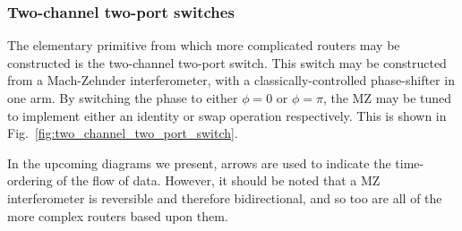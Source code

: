 \documentclass[aps, rmp, twocolumn, amsmath, amssymb, nofootinbib, superscriptaddress, longbibliography, floatfix, table-of-contents, eqsecnum]{revtex4-1}
\begin{document}
\subsubsection{Two-channel two-port switches} 

The elementary primitive from which more complicated routers may be constructed is the two-channel two-port switch. This switch may be constructed from a Mach-Zehnder interferometer, with a classically-controlled phase-shifter in one arm. By switching the phase to either \mbox{$\phi=0$} or \mbox{$\phi=\pi$}, the MZ may be tuned to implement either an identity or swap operation respectively. This is shown in Fig.~\ref{fig:two_channel_two_port_switch}.

In the upcoming diagrams we present, arrows are used to indicate the time-ordering of the flow of data. However, it should be noted that a MZ interferometer is reversible and therefore bidirectional, and so too are all of the more complex routers based upon them.
\end{document}

